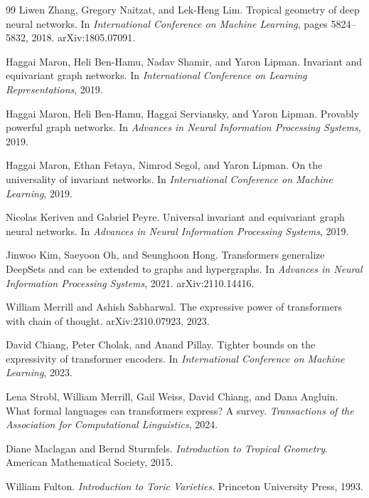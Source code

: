 \documentclass[11pt]{article}
\begin{document}
\begin{thebibliography}{99}
Liwen Zhang, Gregory Naitzat, and Lek-Heng Lim.
\newblock Tropical geometry of deep neural networks.
\newblock In \emph{International Conference on Machine Learning}, pages 5824--5832, 2018.
\newblock arXiv:1805.07091.

Haggai Maron, Heli Ben-Hamu, Nadav Shamir, and Yaron Lipman.
\newblock Invariant and equivariant graph networks.
\newblock In \emph{International Conference on Learning Representations}, 2019.

Haggai Maron, Heli Ben-Hamu, Haggai Serviansky, and Yaron Lipman.
\newblock Provably powerful graph networks.
\newblock In \emph{Advances in Neural Information Processing Systems}, 2019.

Haggai Maron, Ethan Fetaya, Nimrod Segol, and Yaron Lipman.
\newblock On the universality of invariant networks.
\newblock In \emph{International Conference on Machine Learning}, 2019.

Nicolas Keriven and Gabriel Peyre.
\newblock Universal invariant and equivariant graph neural networks.
\newblock In \emph{Advances in Neural Information Processing Systems}, 2019.

Jinwoo Kim, Saeyoon Oh, and Seunghoon Hong.
\newblock Transformers generalize DeepSets and can be extended to graphs and hypergraphs.
\newblock In \emph{Advances in Neural Information Processing Systems}, 2021.
\newblock arXiv:2110.14416.

William Merrill and Ashish Sabharwal.
\newblock The expressive power of transformers with chain of thought.
\newblock arXiv:2310.07923, 2023.

David Chiang, Peter Cholak, and Anand Pillay.
\newblock Tighter bounds on the expressivity of transformer encoders.
\newblock In \emph{International Conference on Machine Learning}, 2023.

Lena Strobl, William Merrill, Gail Weiss, David Chiang, and Dana Angluin.
\newblock What formal languages can transformers express? A survey.
\newblock \emph{Transactions of the Association for Computational Linguistics}, 2024.

Diane Maclagan and Bernd Sturmfels.
\newblock \emph{Introduction to Tropical Geometry}.
\newblock American Mathematical Society, 2015.

William Fulton.
\newblock \emph{Introduction to Toric Varieties}.
\newblock Princeton University Press, 1993.


\end{thebibliography}
\end{document}
